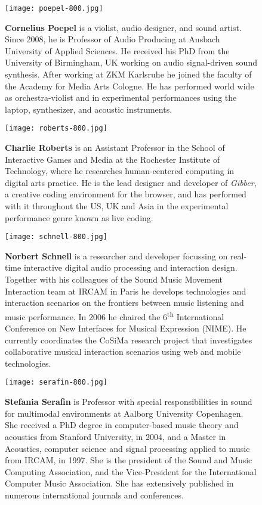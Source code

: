 \begin{authbio}
\begin{figure}[H]
  \sidecaption[t]
  \texttt{[image: poepel-800.jpg]}
  \caption{\textbf{Cornelius Poepel} is a violist, audio designer, and sound artist. Since 2008, he is Professor of Audio Producing at Ansbach University of Applied Sciences. He received his PhD from the University of Birmingham, UK working on audio signal-driven sound synthesis. After working at ZKM Karlsruhe he joined the faculty of the Academy for Media Arts Cologne. He has performed world wide as orchestra-violist and in experimental performances using the laptop, synthesizer, and acoustic instruments.}
\end{figure}

\begin{figure}[H]
  \sidecaption[t]
  \texttt{[image: roberts-800.jpg]}
  \caption{\textbf{Charlie Roberts} is an Assistant Professor in the School of Interactive Games and Media at the Rochester Institute of Technology, where he researches human-centered computing in digital arts practice. He is the lead designer and developer of \textit{Gibber}, a creative coding environment for the browser, and has performed with it throughout the US, UK and Asia in the experimental performance genre known as live coding.}
\end{figure}

\begin{figure}[H]
  \sidecaption[t]
  \texttt{[image: schnell-800.jpg]}
  \caption{\textbf{Norbert Schnell} is a researcher and developer focussing on real-time interactive digital audio processing and interaction design. Together with his colleagues of the Sound Music Movement Interaction team at IRCAM in Paris he develops technologies and interaction scenarios on the frontiers between music listening and music performance. In 2006 he chaired the 6\textsuperscript{th} International Conference on New Interfaces for Musical Expression (NIME). He currently coordinates the CoSiMa research project that investigates collaborative musical interaction scenarios using web and mobile technologies.}
\end{figure}


\begin{figure}[H]
  \sidecaption[t]
  \texttt{[image: serafin-800.jpg]}
  \caption{\textbf{Stefania Serafin} is Professor with special responsibilities in sound for multimodal environments at Aalborg University Copenhagen. She received a PhD degree in computer-based music theory and acoustics from Stanford University, in 2004, and a Master in Acoustics, computer science and signal processing applied to music from IRCAM, in 1997. She is the president of the Sound and Music Computing Association, and the Vice-President for the International Computer Music Association. She has extensively published in numerous international journals and conferences.}
\end{figure}


\end{authbio}
